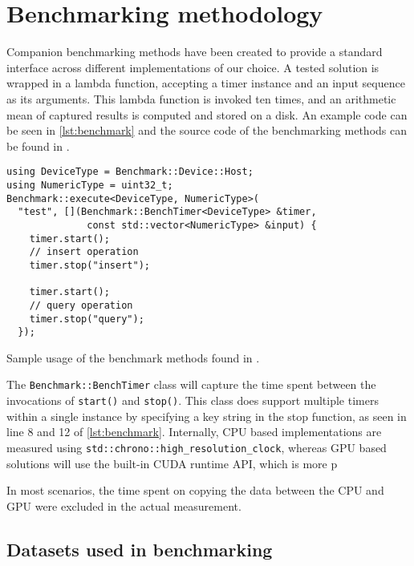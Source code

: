 \section{Benchmarking methodology}\label{section:benchmarking}

Companion benchmarking methods have been created to provide a standard interface across different implementations of our choice. A tested solution is wrapped in a lambda function, accepting a timer instance and an input sequence as its arguments. This lambda function is invoked ten times, and an arithmetic mean of captured results is computed and stored on a disk. An example code can be seen in \cref{lst:benchmark} and the source code of the benchmarking methods can be found in .

\begin{listing}
  \begin{verbatim}
using DeviceType = Benchmark::Device::Host;
using NumericType = uint32_t;
Benchmark::execute<DeviceType, NumericType>(
  "test", [](Benchmark::BenchTimer<DeviceType> &timer,
              const std::vector<NumericType> &input) {
    timer.start();
    // insert operation
    timer.stop("insert");

    timer.start();
    // query operation
    timer.stop("query");
  });
  \end{verbatim}
  \caption{Sample usage of the benchmark methods found in .}
  \label{lst:benchmark}
\end{listing}

The \texttt{Benchmark::BenchTimer} class will capture the time spent between the invocations of \texttt{start()} and \texttt{stop()}. This class does support multiple timers within a single instance by specifying a key string in the stop function, as seen in line 8 and 12 of \cref{lst:benchmark}. Internally, CPU based implementations are measured using \texttt{std::chrono::high_resolution_clock}, whereas GPU based solutions will use the built-in CUDA runtime API, which is more p

In most scenarios, the time spent on copying the data between the CPU and GPU were excluded in the actual measurement.

\subsection{Datasets used in benchmarking}\label{subsection:benchmark:datasets}

